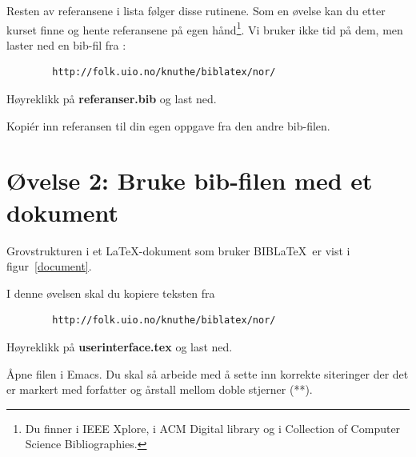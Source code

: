 \documentclass[11pt,norsk,a4paper]{article}
\newcommand{\blt}{B{\smaller[2]IB}\discretionary{-}{}{\kern
    -0.12em}\LaTeX{}}
\begin{document}
\begin{itemize}


\end{itemize}

Resten av referansene i lista følger disse rutinene. Som en øvelse kan
du etter kurset finne og hente referansene på egen hånd\footnote{Du finner 
\cite{shneiderman1983} i IEEE Xplore,
\cite{jacob1986,myers1995} i ACM Digital library og 
\cite{foley1990,foley1987,shneiderman1992,stephenson1999} i Collection of Computer Science Bibliographies.}. Vi bruker ikke tid på dem, men laster ned en bib-fil fra :

{\footnotesize\begin{verbatim}
        http://folk.uio.no/knuthe/biblatex/nor/
\end{verbatim}}
\noindent{}Høyreklikk på \textbf{referanser.bib} og last ned.

Kopiér inn referansen til din egen oppgave fra den
andre bib-filen.


\section{Øvelse 2: Bruke bib-filen med et dokument}

Grovstrukturen i et \LaTeX-dokument som bruker \blt\ er vist i
figur~\ref{document}. 

I denne øvelsen skal du kopiere teksten fra

{\footnotesize\begin{verbatim}
        http://folk.uio.no/knuthe/biblatex/nor/
\end{verbatim}}
\noindent{}Høyreklikk på \textbf{userinterface.tex} og last ned.

Åpne filen i Emacs. Du skal så arbeide med å sette inn
korrekte siteringer der det er markert med forfatter og årstall mellom
doble stjerner (**).
\end{document}
